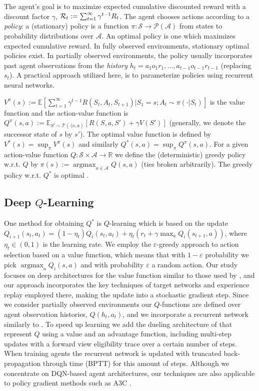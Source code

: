 \documentclass{article}
\def\argmax{\mathop{\arg\max}}
\def\R{{\cal R}}
\begin{document}
The agent's goal is to maximize expected cumulative discounted reward with a discount factor $\gamma$, $\R_t := \sum_{t=1}^{\infty}{\gamma^{t-1} R_{t}}$. The agent chooses actions according to a \emph{policy}: a (stationary)  policy is a function $\pi:\mathcal{S}\to\mathcal{P(A)}$ from states to probability distributions over $\mathcal{A}$. An optimal policy is one which maximizes expected cumulative reward. In fully observed environments, stationary optimal policies exist. In partially observed environments, the policy usually incorporates past agent observations from the \emph{history} $h_t=a_1o_1r_1,...,a_{t-1}o_{t-1}r_{t-1}$ (replacing $s_t$). A practical approach utilized here, is to parameterize policies using recurrent neural networks.

$V^\pi(s) := \mathbb{E} [\sum_{t=1}^\infty \gamma^{t-1} R(S_t, A_t,S_{t+1})|S_1 = s;A_t\sim \pi(\cdot|S_t)]$ is the value function and the action-value function is $Q^\pi(s,a) :=  \mathbb{E}_{S'\sim \mathcal{T}(\cdot|s,a)} [R(S, a,S') + \gamma V(S')]$ (generally, we denote the successor state of $s$ by $s'$). The optimal value function is defined by $V^*(s) = \sup _\pi  V^\pi(s)$ and similarly  $Q^*(s,a) = \sup_\pi Q^\pi(s,a)$. For a given action-value function $Q : \mathcal{S} \times \mathcal{A}\to \mathbb{R}$ we define the (deterministic) greedy policy w.r.t. $Q$ by $\pi(s) := \argmax_ {a\in\mathcal{A}} Q(s, a)$ (ties broken arbitrarily). The greedy policy w.r.t. $Q^*$ is optimal \citep[e.g.][]{SzepesvariAlgorithms}.

\subsection{Deep $Q$-Learning}

One method for obtaining $Q^*$ is $Q$-learning which is based on the update $Q_{i+1}(s_t,a_t)=(1-\eta_t) Q_i(s_t,a_t)+\eta_t(r_t+\gamma \max_a Q_i(s_{t+1},a))$, where $\eta_t\in (0,1)$ is the learning rate. We employ the $\varepsilon$-greedy approach to action selection based on a value function, which means that with $1-\varepsilon$ probability we pick $\argmax_a Q_i(s,a)$ and with probability $\varepsilon$ a random action. Our study focuses on deep architectures for the value function similar to those used by \citet{dqn15}, and our approach incorporates the key techniques of target networks and experience replay employed there, making the update into a stochastic gradient step. Since we consider partially observed environments our $Q$-functions are defined over agent observation histories, $Q(h_t,a_t)$,  and we incorporate a recurrent network similarly to \citet{HausknechtStoneRecurrent}. To speed up learning we add the dueling architecture of \citet{WangDuelling} that represent $Q$ using a value and an advantage function, including multi-step updates with a forward view eligibility trace \citep[e.g.][]{HarbPrecupRecurrance} over a certain number of steps. When training agents the recurrent network is updated with truncated back-propagation through time (BPTT) for this amount of steps. Although we concentrate on DQN-based agent architectures, our techniques are also applicable to policy gradient methods such as A3C \citep{MnihAsynchronous}.
\end{document}

